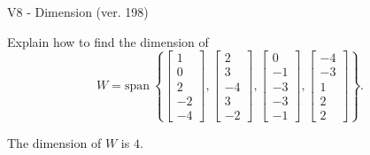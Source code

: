 \begin{exercise}
  \begin{exerciseTitle}V8 - Dimension (ver. 198)\end{exerciseTitle}
  \begin{exerciseStatement}
    Explain how to find the dimension of 
\[W=\mathrm{span}\ \left\{\left[\begin{array}{r}
1 \\
0 \\
2 \\
-2 \\
-4
\end{array}\right] , \left[\begin{array}{r}
2 \\
3 \\
-4 \\
3 \\
-2
\end{array}\right] , \left[\begin{array}{r}
0 \\
-1 \\
-3 \\
-3 \\
-1
\end{array}\right] , \left[\begin{array}{r}
-4 \\
-3 \\
1 \\
2 \\
2
\end{array}\right]\right\}.\]



  \end{exerciseStatement}
  \begin{exerciseAnswer}
   The dimension of \(W\) is  \(4\).
  


  \end{exerciseAnswer}
\end{exercise}